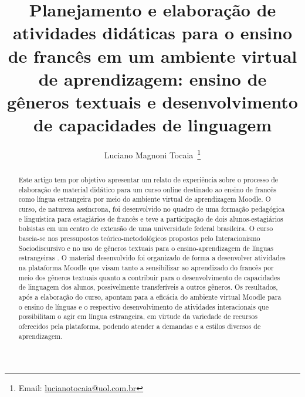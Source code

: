 \documentclass[portuguese]{textolivre}
\title{Planejamento e elaboração de atividades didáticas para o ensino de francês em um ambiente virtual de aprendizagem: ensino de gêneros textuais e desenvolvimento de capacidades de linguagem}
\author[1]{Luciano Magnoni Tocaia~\orcid{0000-0002-1259-2045}\thanks{Email: \href{mailto:lucianotocaia@uol.com.br}{lucianotocaia@uol.com.br}}}
\affil[1]{Universidade Federal de Minas Gerais, Faculdade de Letras, Belo Horizonte, MG, Brasil.}
\begin{document}
\maketitle
\begin{polyabstract}
\begin{abstract}
Este artigo tem por objetivo apresentar um relato de experiência sobre o processo de elaboração de material didático para um curso online destinado ao ensino de francês como língua estrangeira por meio do ambiente virtual de aprendizagem Moodle. O curso, de natureza assíncrona, foi desenvolvido no quadro de uma formação pedagógica e linguística para estagiários de francês e teve a participação de dois alunos-estagiários bolsistas em um centro de extensão de uma universidade federal brasileira. O curso baseia-se nos pressupostos teórico-metodológicos propostos pelo Interacionismo Sociodiscursivo \cite{bronckart_atividade_1999,bronckart_teorias_2021} e no uso de gêneros textuais para o ensino-aprendizagem de línguas estrangeiras \cite{dolz_pour_1998,schneuwly_generos_2004}. O material desenvolvido foi organizado de forma a desenvolver atividades na plataforma Moodle que visam tanto a sensibilizar ao aprendizado do francês por meio dos gêneros textuais quanto a contribuir para o desenvolvimento de capacidades de linguagem \cite{schneuwly_generos_2004,stutz_construcao_2011} dos alunos, possivelmente transferíveis a outros gêneros. Os resultados, após a elaboração do curso, apontam para a eficácia do ambiente virtual Moodle para o ensino de línguas e o respectivo desenvolvimento de atividades interacionais que possibilitam o agir em língua estrangeira, em virtude da variedade de recursos oferecidos pela plataforma, podendo atender a demandas e a estilos diversos de aprendizagem.

\end{abstract}


\end{polyabstract}
\end{document}
